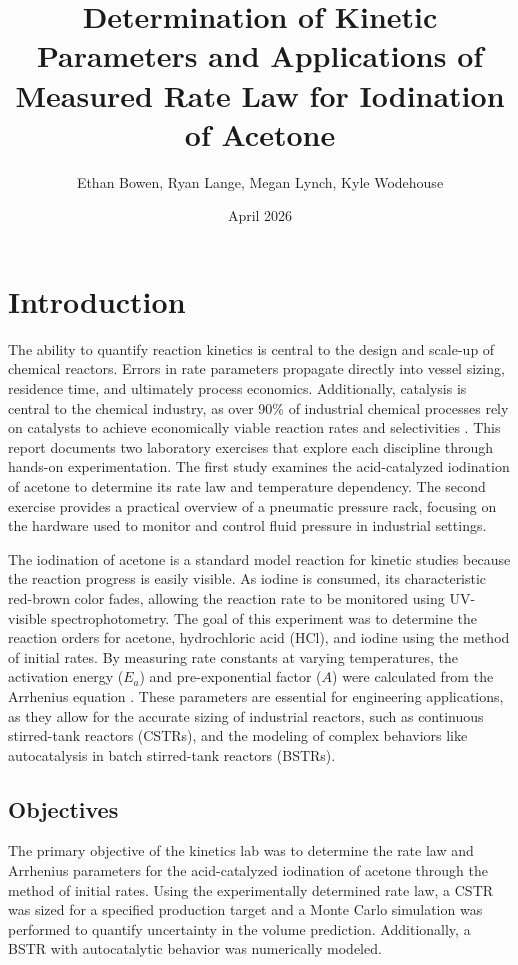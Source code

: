 \documentclass{article}
\title{Determination of Kinetic Parameters and Applications of Measured Rate Law for Iodination of Acetone}
\author{Ethan Bowen, Ryan Lange, Megan Lynch, Kyle Wodehouse}
\date{April 2026}
\begin{document}




\tableofcontents

\section{Introduction}

The ability to quantify reaction kinetics is central to the design and scale-up of chemical reactors. Errors in rate parameters propagate directly into vessel sizing, residence time, and ultimately process economics. Additionally, catalysis is central to the chemical industry, as over 90\% \autocite{armor_new_1991} of industrial chemical processes rely on catalysts to achieve economically viable reaction rates and selectivities \autocite{ertl_handbook_2008, rothenberg_catalysis_2008, armor_history_2011, liu_catalytic_2011, yang_selective_2025, paunovic_exploring_2026, li_critical_2025, xin_roadmap_2026}.  This report documents two laboratory exercises that explore each discipline through hands-on experimentation. The first study examines the acid-catalyzed iodination of acetone to determine its rate law and temperature dependency. The second exercise provides a practical overview of a pneumatic pressure rack, focusing on the hardware used to monitor and control fluid pressure in industrial settings.

The iodination of acetone is a standard model reaction for kinetic studies because the reaction progress is easily visible. As iodine is consumed, its characteristic red-brown color fades, allowing the reaction rate to be monitored using UV-visible spectrophotometry. The goal of this experiment was to determine the reaction orders for acetone, hydrochloric acid (HCl), and iodine using the method of initial rates. By measuring rate constants at varying temperatures, the activation energy ($E_a$) and pre-exponential factor ($A$) were calculated from the Arrhenius equation \autocite{arrhenius}. These parameters are essential for engineering applications, as they allow for the accurate sizing of industrial reactors, such as continuous stirred-tank reactors (CSTRs), and the modeling of complex behaviors like autocatalysis in batch stirred-tank reactors (BSTRs).


\subsection{Objectives}
The primary objective of the kinetics lab was to determine the rate law and Arrhenius parameters for the acid-catalyzed iodination of acetone through the method of initial rates. Using the experimentally determined rate law, a CSTR was sized for a specified production target and a Monte Carlo simulation was performed to quantify uncertainty in the volume prediction. Additionally, a BSTR with autocatalytic behavior was numerically modeled. 
\end{document}
